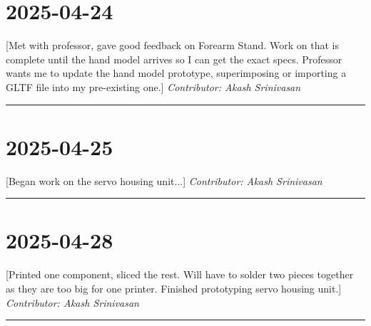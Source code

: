 \documentclass[12pt]{article}
\begin{document}
\section*{2025-04-24}
[Met with professor, gave good feedback on Forearm Stand. Work on that is complete until the hand model arrives so I can get the exact specs. Professor wants me to update the hand model prototype, superimposing or importing a GLTF file into my pre-existing one.]
\vspace{1em}
\noindent\textit{Contributor: Akash Srinivasan}
\vspace{1em}
\hrule

\section*{2025-04-25}
[Began work on the servo housing unit...]
\vspace{1em}
\noindent\textit{Contributor: Akash Srinivasan}
\vspace{1em}
\hrule

\section*{2025-04-28}
[Printed one component, sliced the rest. Will have to solder two pieces together as they are too big for one printer. Finished prototyping servo housing unit.]
\vspace{1em}
\noindent\textit{Contributor: Akash Srinivasan}
\vspace{1em}
\hrule
\end{document}
